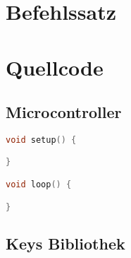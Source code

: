 \section{Befehlssatz}


\section{Quellcode}
\subsection{Microcontroller}
\begin{lstlisting}[language=C,caption={Arduino},captionpos=b,basicstyle=\small,frame=single,breaklines=true]
void setup() {

}

void loop() {

}
\end{lstlisting}
\subsection{Keys Bibliothek}
\begin{lstlisting}[language=C,caption={Arduino},captionpos=b,basicstyle=\small,frame=single,breaklines=true]

\end{lstlisting}